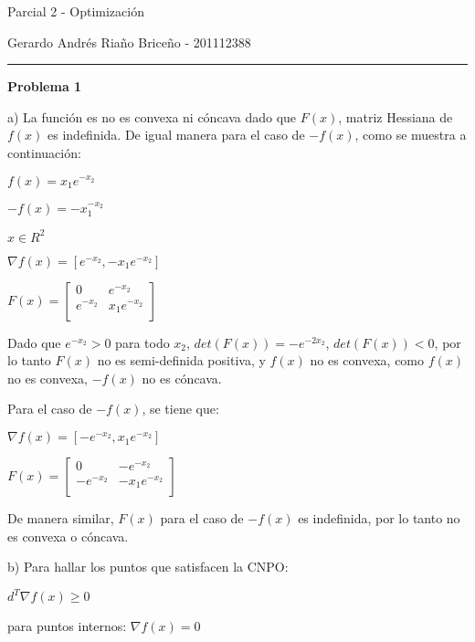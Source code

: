 \documentclass[10pt]{article}
\begin{document}
\begin{center}
\Large{Parcial 2 - Optimizaci\'on}

\Large{Gerardo Andr\'es Ria\~no Brice\~no - 201112388}
\medskip
\hrule
\end{center}

\setlength\parindent{0pt} 

{\bf \Large{Problema 1}}
\medskip

a) La función es no es convexa ni cóncava dado que $F(x)$, matriz Hessiana de $f(x)$ es indefinida. De igual manera para el caso de $-f(x)$, como se muestra a continuación:

\begin{center}
$f(x) = x_1  e^{-x_2}$

$-f(x) = -x_1^{-x_2}$

$x \in R^2 $

$\nabla f(x) = [e^{-x_2}, -x_1e^{-x_2}]$

$F(x) = \left[
{\begin{array}{cc} 
0 & e^{-x_2} \\
e^{-x_2} & x_1e^{-x_2} \\
\end{array}}
\right]$
\end{center}


Dado que $e^{-x_2} > 0$ para todo $x_2$, $det(F(x)) = -e^{-2x_2}$, $det(F(x)) < 0$, por lo tanto $F(x)$ no es semi-definida positiva, y $f(x)$ no es convexa, como $f(x)$ no es convexa, $-f(x)$ no es c\'oncava. 

Para el caso de $-f(x)$, se tiene que:

\begin{center}
$\nabla f(x) = [-e^{-x_2}, x_1e^{-x_2}]$

$F(x) = \left[
{\begin{array}{cc} 
0 & -e^{-x_2} \\
-e^{-x_2} & -x_1e^{-x_2} \\
\end{array}}
\right]$
\end{center} 

De manera similar, $F(x)$ para el caso de $-f(x)$ es indefinida, por lo tanto no es convexa o c\'oncava.

\bigskip

b) Para hallar los puntos que satisfacen la CNPO: 

\begin{center}
$d^T \nabla f(x) \geq 0$

para puntos internos: $\nabla f(x) = 0$
\end{center}
\end{document}
